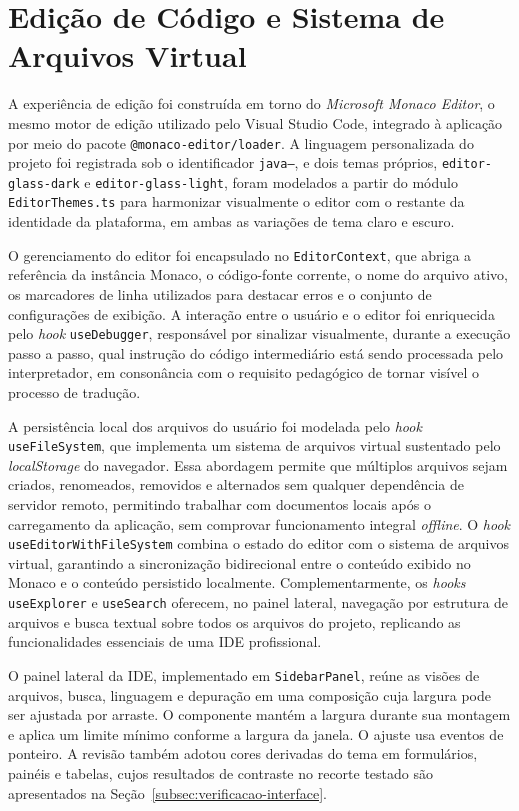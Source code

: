 \section{Edição de Código e Sistema de Arquivos Virtual}
\label{sec:edicao-codigo}

A experiência de edição foi construída em torno do \textit{Microsoft Monaco Editor}, o mesmo motor de edição utilizado pelo Visual Studio Code, integrado à aplicação por meio do pacote \texttt{@monaco-editor/loader}. A linguagem personalizada do projeto foi registrada sob o identificador \texttt{java--}, e dois temas próprios, \texttt{editor-glass-dark} e \texttt{editor-glass-light}, foram modelados a partir do módulo \texttt{EditorThemes.ts} para harmonizar visualmente o editor com o restante da identidade da plataforma, em ambas as variações de tema claro e escuro.

O gerenciamento do editor foi encapsulado no \texttt{EditorContext}, que abriga a referência da instância Monaco, o código-fonte corrente, o nome do arquivo ativo, os marcadores de linha utilizados para destacar erros e o conjunto de configurações de exibição. A interação entre o usuário e o editor foi enriquecida pelo \textit{hook} \texttt{useDebugger}, responsável por sinalizar visualmente, durante a execução passo a passo, qual instrução do código intermediário está sendo processada pelo interpretador, em consonância com o requisito pedagógico de tornar visível o processo de tradução.

A persistência local dos arquivos do usuário foi modelada pelo \textit{hook} \texttt{useFileSystem}, que implementa um sistema de arquivos virtual sustentado pelo \textit{localStorage} do navegador. Essa abordagem permite que múltiplos arquivos sejam criados, renomeados, removidos e alternados sem qualquer dependência de servidor remoto, permitindo trabalhar com documentos locais após o carregamento da aplicação, sem comprovar funcionamento integral \textit{offline}. O \textit{hook} \texttt{useEditorWithFileSystem} combina o estado do editor com o sistema de arquivos virtual, garantindo a sincronização bidirecional entre o conteúdo exibido no Monaco e o conteúdo persistido localmente. Complementarmente, os \textit{hooks} \texttt{useExplorer} e \texttt{useSearch} oferecem, no painel lateral, navegação por estrutura de arquivos e busca textual sobre todos os arquivos do projeto, replicando as funcionalidades essenciais de uma IDE profissional.

O painel lateral da IDE, implementado em \texttt{SidebarPanel}, reúne as visões de arquivos, busca, linguagem e depuração em uma composição cuja largura pode ser ajustada por arraste. O componente mantém a largura durante sua montagem e aplica um limite mínimo conforme a largura da janela. O ajuste usa eventos de ponteiro. A revisão também adotou cores derivadas do tema em formulários, painéis e tabelas, cujos resultados de contraste no recorte testado são apresentados na Seção~\ref{subsec:verificacao-interface}.


